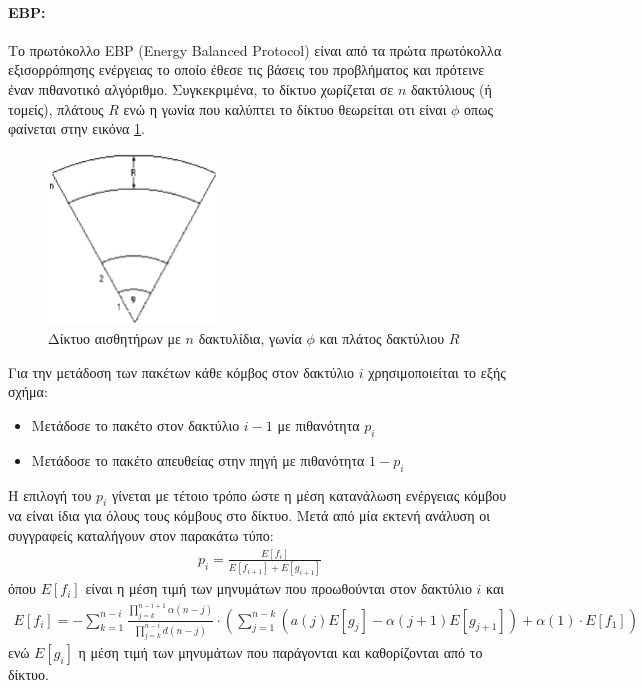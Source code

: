 \paragraph{EBP:} Το πρωτόκολλο EBP (Energy Balanced Protocol) \cite{ebp_protocol} είναι από τα πρώτα πρωτόκολλα εξισορρόπησης ενέργειας το οποίο έθεσε τις βάσεις του
προβλήματος και πρότεινε έναν πιθανοτικό αλγόριθμο. Συγκεκριμένα, το δίκτυο χωρίζεται σε $n$ δακτύλιους (ή τομείς), πλάτους $R$ ενώ η γωνία που καλύπτει το δίκτυο
θεωρείται οτι είναι $\phi$ οπως φαίνεται στην εικόνα \ref{fig:ebp_ring}.

\begin{figure}[h]
	\centering
	\includegraphics[width=0.4\textwidth]{images/ebp_ring.eps}
	\caption{Δίκτυο αισθητήρων με $n$ δακτυλίδια, γωνία $\phi$ και πλάτος δακτύλιου $R$}
	\label{fig:ebp_ring}
\end{figure}

Για την μετάδοση των πακέτων κάθε κόμβος στον δακτύλιο $i$ χρησιμοποιείται το εξής σχήμα:
\begin{itemize}
\item Μετάδοσε το πακέτο στον δακτύλιο $i-1$ με πιθανότητα $p_{i}$
\item Μετάδοσε το πακέτο απευθείας στην πηγή με πιθανότητα $1-p_{i}$
\end{itemize}

Η επιλογή του $p_{i}$ γίνεται με τέτοιο τρόπο ώστε η μέση κατανάλωση ενέργειας κόμβου να είναι ίδια για όλους τους κόμβους στο δίκτυο.
Μετά από μία εκτενή ανάλυση οι συγγραφείς καταλήγουν στον παρακάτω τύπο:
\begin{align*}
p_{i} = \frac{E[f_{i}]}{E[f_{i+1}] + E[g_{i+1}]}
\end{align*}
όπου $E[f_{i}]$ είναι η μέση τιμή των μηνυμάτων που προωθούνται στον δακτύλιο $i$ και
\begin{align*}
E[f_{i}] = - \sum\limits^{n-i}_{k=1}\frac{\prod_{j=k}^{n-i+1}\alpha(n-j)}{\prod_{j=k}^{n-i}d(n-j)}\cdot
\left(\sum\limits_{j=1}^{n-k}(a(j)E[g_{j}]-\alpha(j+1)E[g_{j+1}])+\alpha(1)\cdot E[f_{1}]\right)
\end{align*}
ενώ $E[g_{i}]$ η μέση τιμή των μηνυμάτων που παράγονται και καθορίζονται από το δίκτυο.

